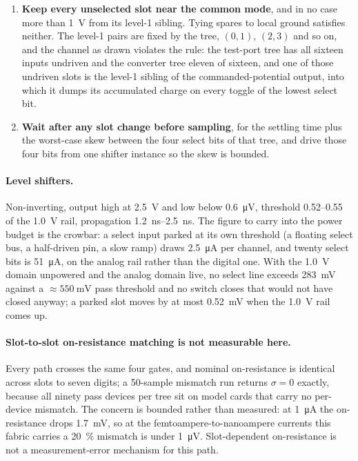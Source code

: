 \begin{enumerate}[nosep]
  \item \textbf{Keep every unselected slot near the common mode}, and in no case
    more than \SI{1}{\volt} from its level-1 sibling. Tying spares to local
    ground satisfies neither. The level-1 pairs are fixed by the tree,
    \((0,1)\), \((2,3)\) and so on, and the channel as drawn violates the
    rule: the test-port tree has all sixteen inputs undriven and the converter
    tree eleven of sixteen, and one of those undriven slots is the level-1
    sibling of the commanded-potential output, into which it dumps its
    accumulated charge on every toggle of the lowest select bit.
  \item \textbf{Wait after any slot change before sampling}, for the settling
    time plus the worst-case skew between the four select bits of that tree, and
    drive those four bits from one shifter instance so the skew is bounded.
\end{enumerate}

\paragraph{Level shifters.} Non-inverting, output high at \SI{2.5}{\volt} and
low below \SI{0.6}{\micro\volt}, threshold \numrange{0.52}{0.55} of the
\SI{1.0}{\volt} rail, propagation \SIrange{1.2}{2.5}{\nano\second}. The figure
to carry into the power budget is the crowbar: a select input parked at its own
threshold (a floating select bus, a half-driven pin, a slow ramp) draws
\SI{2.5}{\micro\ampere} per channel, and twenty select bits is
\SI{51}{\micro\ampere}, on the analog rail rather than the digital one. With the
\SI{1.0}{\volt} domain unpowered and the analog domain live, no select line
exceeds \SI{283}{\milli\volt} against a \(\approx\SI{550}{\milli\volt}\) pass
threshold and no switch closes that would not have closed anyway; a parked slot
moves by at most \SI{0.52}{\milli\volt} when the \SI{1.0}{\volt} rail comes up.

\paragraph{Slot-to-slot on-resistance matching is not measurable here.} Every
path crosses the same four gates, and nominal on-resistance is identical across
slots to seven digits; a 50-sample mismatch run returns \(\sigma = 0\) exactly,
because all ninety pass devices per tree sit on model cards that carry no
per-device mismatch. The concern is bounded rather than measured: at
\SI{1}{\micro\ampere} the on-resistance drops \SI{1.7}{\milli\volt}, so at the
femtoampere-to-nanoampere currents this fabric carries a \SI{20}{\percent}
mismatch is under \SI{1}{\micro\volt}. Slot-dependent on-resistance is not a
measurement-error mechanism for this path.

